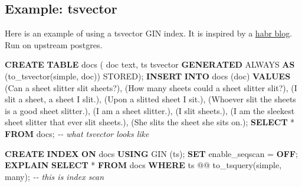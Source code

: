 \documentclass[
]{article}
\newenvironment{Shaded}{}{}
\newcommand{\CommentTok}[1]{\textcolor[rgb]{0.38,0.63,0.69}{\textit{#1}}}
\newcommand{\KeywordTok}[1]{\textcolor[rgb]{0.00,0.44,0.13}{\textbf{#1}}}
\newcommand{\NormalTok}[1]{#1}
\newcommand{\OperatorTok}[1]{\textcolor[rgb]{0.40,0.40,0.40}{#1}}
\newcommand{\StringTok}[1]{\textcolor[rgb]{0.25,0.44,0.63}{#1}}
\begin{document}
\hypertarget{example-tsvector}{%
\subsection{Example: tsvector}\label{example-tsvector}}

Here is an example of using a tsvector GIN index. It is inspired by a
\href{https://habr.com/en/company/postgrespro/blog/448746/}{habr blog}.
Run on upstream postgres.

\begin{Shaded}
\begin{Highlighting}[]
\KeywordTok{CREATE} \KeywordTok{TABLE}\NormalTok{ docs (}
\NormalTok{    doc text,}
\NormalTok{    ts tsvector }\KeywordTok{GENERATED}\NormalTok{ ALWAYS }\KeywordTok{AS}\NormalTok{ (to\_tsvector(}\StringTok{\textquotesingle{}simple\textquotesingle{}}\NormalTok{, doc)) STORED);}
\KeywordTok{INSERT} \KeywordTok{INTO}\NormalTok{ docs (doc) }\KeywordTok{VALUES}
\NormalTok{  (}\StringTok{\textquotesingle{}Can a sheet slitter slit sheets?\textquotesingle{}}\NormalTok{),}
\NormalTok{  (}\StringTok{\textquotesingle{}How many sheets could a sheet slitter slit?\textquotesingle{}}\NormalTok{),}
\NormalTok{  (}\StringTok{\textquotesingle{}I slit a sheet, a sheet I slit.\textquotesingle{}}\NormalTok{),}
\NormalTok{  (}\StringTok{\textquotesingle{}Upon a slitted sheet I sit.\textquotesingle{}}\NormalTok{),}
\NormalTok{  (}\StringTok{\textquotesingle{}Whoever slit the sheets is a good sheet slitter.\textquotesingle{}}\NormalTok{),}
\NormalTok{  (}\StringTok{\textquotesingle{}I am a sheet slitter.\textquotesingle{}}\NormalTok{),}
\NormalTok{  (}\StringTok{\textquotesingle{}I slit sheets.\textquotesingle{}}\NormalTok{),}
\NormalTok{  (}\StringTok{\textquotesingle{}I am the sleekest sheet slitter that ever slit sheets.\textquotesingle{}}\NormalTok{),}
\NormalTok{  (}\StringTok{\textquotesingle{}She slits the sheet she sits on.\textquotesingle{}}\NormalTok{);}
\KeywordTok{SELECT} \OperatorTok{*} \KeywordTok{FROM}\NormalTok{ docs; }\CommentTok{{-}{-} what tsvector looks like}
\end{Highlighting}
\end{Shaded}

\begin{Shaded}
\begin{Highlighting}[]
\KeywordTok{CREATE} \KeywordTok{INDEX} \KeywordTok{ON}\NormalTok{ docs }\KeywordTok{USING}\NormalTok{ GIN (ts);}
\KeywordTok{SET}\NormalTok{ enable\_seqscan }\OperatorTok{=} \KeywordTok{OFF}\NormalTok{;}
\KeywordTok{EXPLAIN} \KeywordTok{SELECT} \OperatorTok{*} \KeywordTok{FROM}\NormalTok{ docs}
    \KeywordTok{WHERE}\NormalTok{ ts @@ to\_tsquery(}\StringTok{\textquotesingle{}simple\textquotesingle{}}\NormalTok{, }\StringTok{\textquotesingle{}many\textquotesingle{}}\NormalTok{); }\CommentTok{{-}{-} this is index scan}
\end{Highlighting}
\end{Shaded}
\end{document}
